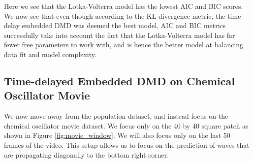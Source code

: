 \documentclass[letterpaper, 10 pt, conference]{ieeeconf}  %
\begin{document}
Here we see that the Lotka-Volterra model has the lowest AIC and BIC scores. We now see that even though according to the KL divergence metric, the time-delay embedded DMD was deemed the best model, AIC and BIC metrics successfully take into account the fact that the Lotka-Volterra model has far fewer free parameters to work with, and is hence the better model at balancing data fit and model complexity.

\subsection{Time-delayed Embedded DMD on Chemical Oscillator Movie}
We now move away from the population dataset, and instead focus on the chemical oscillator movie dataset. We focus only on the 40 by 40 square patch as shown in Figure \ref{fig:movie_window}. We will also focus only on the last 50 frames of the video. This setup allows us to focus on the prediction of waves that are propagating diagonally to the bottom right corner.
\end{document}
